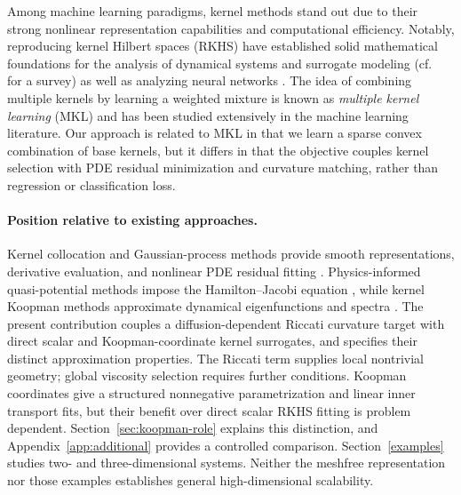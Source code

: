 \documentclass[11pt]{article}
\theoremstyle{plain}      %
\theoremstyle{definition} %
\providecommand{\DIFaddtex}[1]{{\protect\color{blue}#1}} %
\providecommand{\DIFaddbegin}{} %
\providecommand{\DIFadd}[1]{\texorpdfstring{\DIFaddtex{#1}}{#1}} %
\newcommand{\DIFaddincludegraphics}[2][]{{\color{blue}\fbox{\DIFOincludegraphics[#1]{#2}}}} %
\DeclareRobustCommand{\DIFaddbegin}{\DIFOaddbegin \let\includegraphics\DIFaddincludegraphics} %
\begin{document}
Among machine learning paradigms, kernel methods stand out due to their strong nonlinear representation capabilities and computational efficiency. Notably, reproducing kernel Hilbert spaces (RKHS) \cite{CuckerandSmale} have established solid mathematical foundations for the analysis of  dynamical systems \cite{BH4, yk1, bhcm11,bhcm1, lyap_bh, bh_sparse_kfs, BHPhysicaD, hamzi2019kernel, bh2020b,SKO3,ALEXANDER2020132520,bh12,bh17,hb17,mmd_kernels_bh, hamzipaillet,jalalian_deds_2023,lee2024note, hamzi2025kernel_lions, bittracher2021dimensionality} and surrogate modeling (cf.\ \cite{santinhaasdonk19} for a survey) as well as analyzing neural networks \cite{smirnov2022mean}. The idea of combining multiple kernels by learning a weighted mixture is known as \emph{multiple kernel learning} (MKL) \cite{lanckriet2004learning, bach2004multiple} and has been studied extensively in the machine learning literature. Our approach is related to MKL in that we learn a sparse convex combination of base kernels, but it differs in that the objective couples kernel selection with PDE residual minimization and curvature matching, rather than regression or classification loss.

\DIFaddbegin \paragraph{\DIFadd{Position relative to existing approaches.}}\label{sec:positioning}
\DIFadd{Kernel collocation and Gaussian-process methods provide smooth representations, derivative evaluation, and nonlinear PDE residual fitting \cite{Chen2021}. Physics-informed quasi-potential methods impose the Hamilton--Jacobi equation \cite{li2022machine,lin2022data}, while kernel Koopman methods approximate dynamical eigenfunctions and spectra \cite{Williams2015}. The present contribution couples a diffusion-dependent Riccati curvature target with direct scalar and Koopman-coordinate kernel surrogates, and specifies their distinct approximation properties. The Riccati term supplies local nontrivial geometry; global viscosity selection requires further conditions. Koopman coordinates give a structured nonnegative parametrization and linear inner transport fits, but their benefit over direct scalar RKHS fitting is problem dependent. Section~\ref{sec:koopman-role} explains this distinction, and Appendix~\ref{app:additional} provides a controlled comparison. Section~\ref{examples} studies two- and three-dimensional systems. Neither the meshfree representation nor those examples establishes general high-dimensional scalability.
}
\end{document}
